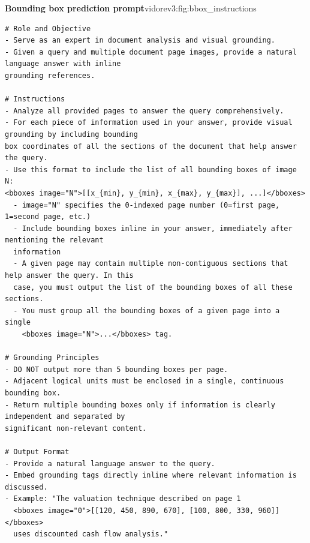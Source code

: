 \begin{promptfigure}{\textbf{Bounding box prediction prompt}}{vidorev3:fig:bbox_instructions}
\begin{Verbatim}[breaklines=true,breakanywhere=true,fontsize=\scriptsize]
# Role and Objective
- Serve as an expert in document analysis and visual grounding.
- Given a query and multiple document page images, provide a natural language answer with inline
grounding references.

# Instructions
- Analyze all provided pages to answer the query comprehensively.
- For each piece of information used in your answer, provide visual grounding by including bounding
box coordinates of all the sections of the document that help answer the query.
- Use this format to include the list of all bounding boxes of image N:
<bboxes image="N">[[x_{min}, y_{min}, x_{max}, y_{max}], ...]</bboxes>
  - image="N" specifies the 0-indexed page number (0=first page, 1=second page, etc.)
  - Include bounding boxes inline in your answer, immediately after mentioning the relevant
  information
  - A given page may contain multiple non-contiguous sections that help answer the query. In this
  case, you must output the list of the bounding boxes of all these sections.
  - You must group all the bounding boxes of a given page into a single 
    <bboxes image="N">...</bboxes> tag.

# Grounding Principles
- DO NOT output more than 5 bounding boxes per page.
- Adjacent logical units must be enclosed in a single, continuous bounding box.
- Return multiple bounding boxes only if information is clearly independent and separated by
significant non-relevant content.

# Output Format
- Provide a natural language answer to the query.
- Embed grounding tags directly inline where relevant information is discussed.
- Example: "The valuation technique described on page 1 
  <bboxes image="0">[[120, 450, 890, 670], [100, 800, 330, 960]]</bboxes> 
  uses discounted cash flow analysis."
\end{Verbatim}
\end{promptfigure}
